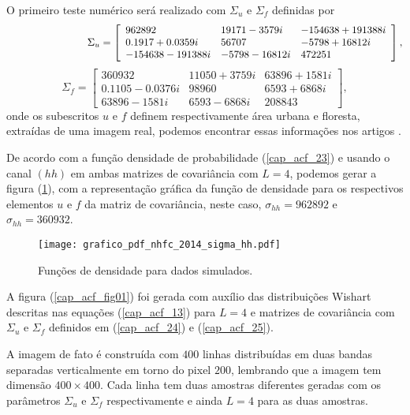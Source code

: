 O primeiro teste numérico será realizado com $\Sigma_u$ e $\Sigma_f$ definidas por
\begin{equation}\label{cap_acf_24}
	\hspace{2.75cm} \Sigma_{u}= \left[
\begin{array}{lll}
	962892             &19171 - 3579i&     -154638 + 191388i \\
	0.1917 + 0.0359i   &56707        &     -5798 + 16812i  \\
	-154638 - 191388i  &-5798 - 16812i&      472251 
\end{array}
\right],
\end{equation}
\begin{equation}\label{cap_acf_25}
 \Sigma_{f}= \left[
\begin{array}{lll}
	360932            & 11050 + 3759i&   63896 + 1581i \\
	0.1105 - 0.0376i  & 98960       &   6593 + 6868i \\
	63896  - 1581i    & 6593  - 6868i&   208843
\end{array}
\right],
\end{equation}
onde os subescritos $u$ e $f$ definem respectivamente área urbana e floresta, extraídas de uma imagem real, podemos encontrar essas informações nos artigos \citep{fbgm, nhfc}.

De acordo com a função densidade de probabilidade (\ref{cap_acf_23}) e usando o canal $(hh)$ em ambas matrizes de covariância com $L=4$, podemos gerar a figura (\ref{cap_acf_fig02}), com a representação gráfica da função de densidade para os respectivos elementos $u$ e $f$ da matriz de covariância, neste caso, $\sigma_{hh}=962892$ e $\sigma_{hh}= 360932$. 

\begin{figure}[hbt]
	\centering
  \texttt{[image: grafico\_pdf\_nhfc\_2014\_sigma\_hh.pdf]}
	\caption{Funções de densidade para dados simulados.}\label{cap_acf_fig02}
\end{figure}

A figura (\ref{cap_acf_fig01}) foi gerada com auxílio das distribuições Wishart descritas nas equações (\ref{cap_acf_13}) para $L=4$ e matrizes de covariância com $\Sigma_{u}$ e $\Sigma_{f}$ definidos em (\ref{cap_acf_24}) e (\ref{cap_acf_25}).
	
A imagem de fato é construída com $400$ linhas distribuídas em duas bandas separadas verticalmente em torno do pixel $200$, lembrando que a imagem tem dimensão $400 \times 400$. Cada linha  tem duas amostras diferentes geradas com os parâmetros $\Sigma_{u}$ e $\Sigma_{f}$ respectivamente e ainda $L=4$ para as duas amostras.  

